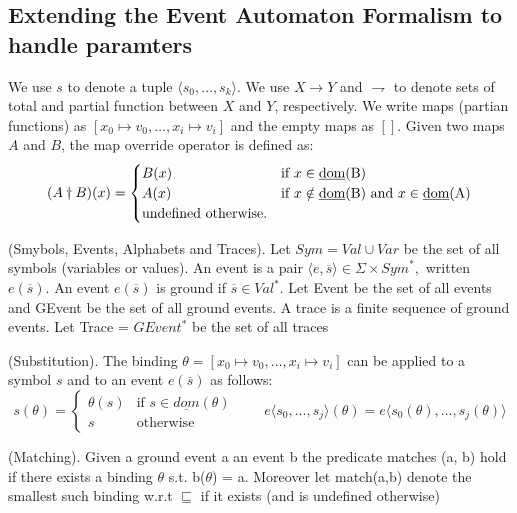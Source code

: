 		\subsection{Extending the Event Automaton Formalism to handle paramters}
			
			We use $s$ to denote a tuple $\langle s_0,\dots,s_k \rangle$. We use $X \rightarrow Y$ and $\rightharpoondown$ to denote sets of total and partial function between
			$X$ and $Y$, respectively. We write maps (partian functions) as $[x_0 \mapsto v_0,\dots,x_i \mapsto v_i]$ and the empty maps as $[]$. Given two maps $A$ and $B$,
			the map override operator is defined as:
				\[
				 (A \dagger B)(x) = 
				  \begin{cases} 
				   B(x) & \text{if } x \in \text{\underline{dom}(B)} \\
				   A(x) & \text{if } x \notin \text{\underline{dom}(B)} \text{ and } x \in \text{\underline{dom}(A)} \\
				   \text{undefined otherwise.}
				  \end{cases}
				\]
 			
			\begin{dfn}
				(Smybols, Events, Alphabets and Traces).
				Let $\mathit{Sym} = \mathit{Val} \cup \mathit{Var}$ be the set of all symbols (variables or values).
				An event is a pair $\langle e, \overline{s} \rangle \in \Sigma \times \mathit{Sym}^\ast,$ written $e(\overline{s})$.
				An event $e(\overline{s})$ is ground if $\overline{s} \in \mathit{Val}^\ast$.
				Let Event be the set of all events and GEvent be the set of all ground events.
				A trace is a finite sequence of ground events.
				Let Trace = $GEvent^\ast$ be the set of all traces
			\end{dfn}
			
			\begin{dfn}
				(Substitution).
				The binding $\theta = [x_0 \mapsto v_0, \dots, x_i \mapsto v_i]$ can be applied to a symbol $s$ and to an event
				$e(\overline{s})$ as follows: 
				\[
				 s(\theta) = 
				  \begin{cases} 
				   \theta(s) & \text{if } s \in \underline{dom}(\theta) \\
				   s & \text{otherwise}
				  \end{cases}
				  \qquad e \langle s_0,\ldots,s_j \rangle (\theta) = e \langle s_0(\theta),\ldots,s_j(\theta) \rangle
				\]
			\end{dfn}
			
			\begin{dfn}
				(Matching).
				Given a ground event a an event b the predicate matches (a, b) hold if there exists a binding $\theta$ s.t. b($\theta$) = a.
				Moreover let match(a,b) denote the smallest such binding w.r.t $\sqsubseteq$ if it exists (and is undefined otherwise)
			\end{dfn}
			
